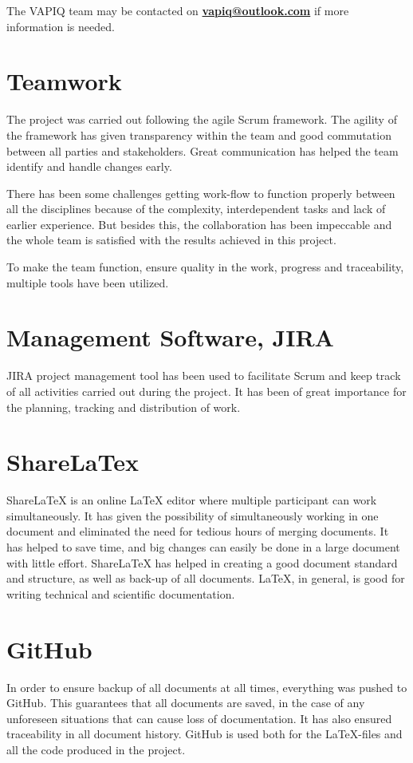 The VAPIQ team may be contacted on \textbf{\href{mailto:vapiq@outlook.com}{vapiq@outlook.com}} if more information is needed.  \bigskip

\section{Teamwork}

The project was carried out following the agile Scrum framework. The agility of the framework has given transparency within the team and good commutation between all parties and stakeholders. Great communication has helped the team identify and handle changes early. \bigskip

There has been some challenges getting work-flow to function properly between all the disciplines because of the complexity, interdependent tasks and lack of earlier experience. But besides this, the collaboration has been impeccable and the whole team is satisfied with the results achieved in this project. \bigskip

To make the team function, ensure quality in the work, progress and traceability, multiple tools have been utilized. 
\section{Management Software, JIRA}
JIRA project management tool has been used to facilitate Scrum and keep track of all activities carried out during the project.  It has been of great importance for the planning, tracking and distribution of work.

\section{ShareLaTex}
ShareLaTeX is an online LaTeX editor where multiple participant can work simultaneously. It has given the possibility of simultaneously working in one document and eliminated the need for tedious hours of merging documents. It has helped to save time, and big changes can easily be done in a large document with little effort. ShareLaTeX has helped in creating a good document standard and structure, as well as back-up of all documents. LaTeX, in general, is good for writing technical and scientific documentation. 

\section{GitHub}
In order to ensure backup of all documents at all times, everything was pushed to GitHub. This guarantees that all documents are saved, in the case of any unforeseen situations that can cause loss of documentation. It has also ensured traceability in all document history. GitHub is used both for the LaTeX-files and all the code produced in the project.




